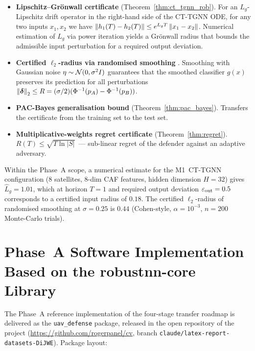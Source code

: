 \begin{itemize}\setlength\itemsep{0.15em}
\item \textbf{Lipschitz--Grönwall certificate}
(Theorem~\ref{thm:ct_tgnn_rob}). For an $L_g$-Lipschitz drift
operator in the right-hand side of the CT-TGNN ODE, for any two
inputs $x_1,x_2$ we have
$\left\lVert h_1(T)-h_2(T)\right\rVert \le e^{L_g T}\left\lVert x_1-x_2\right\rVert$. Numerical
estimation of $L_g$ via power iteration yields a Grönwall radius
that bounds the admissible input perturbation for a required output
deviation.

\item \textbf{Certified $\ell_2$-radius via randomised smoothing}
\cite{Cohen2019}. Smoothing with Gaussian noise
$\eta\sim\mathcal{N}(0,\sigma^2 I)$ guarantees that the smoothed classifier
$g(x)$ preserves its prediction for all perturbations
$\left\lVert\boldsymbol{\delta}\right\rVert_2 \le R = (\sigma/2)(\Phi^{-1}(p_A) - \Phi^{-1}(p_B))$.

\item \textbf{PAC-Bayes generalisation bound}
(Theorem~\ref{thm:pac_bayes}). Transfers the certificate from the
training set to the test set.

\item \textbf{Multiplicative-weights regret certificate}
(Theorem~\ref{thm:regret}). $R(T)\le\sqrt{T\ln|S|}$~--- sub-linear
regret of the defender against an adaptive adversary.
\end{itemize}

Within the Phase~A scope, a numerical estimate for the
\textsf{M1~CT-TGNN} configuration (8 satellites, 8-dim CAF features,
hidden dimension $H=32$) gives $\hat L_g = 1.01$, which at horizon
$T=1$ and required output deviation $\varepsilon_{\text{out}}=0.5$ corresponds
to a certified input radius of $0.18$. The certified $\ell_2$-radius
of randomised smoothing at $\sigma=0.25$ is $0.44$ (Cohen-style,
$\alpha=10^{-3}$, $n=200$ Monte-Carlo trials).

\section{Phase~A Software Implementation Based on the
\textsf{robustnn-core} Library}
\label{sec:uav_phase_a}

The Phase~A reference implementation of the four-stage transfer
roadmap is delivered as the \texttt{uav\_defense} package, released
in the open repository of the project
(\url{https://github.com/rogerpanel/cv},
branch \texttt{claude/latex-report-datasets-DiJWE}). Package layout:

